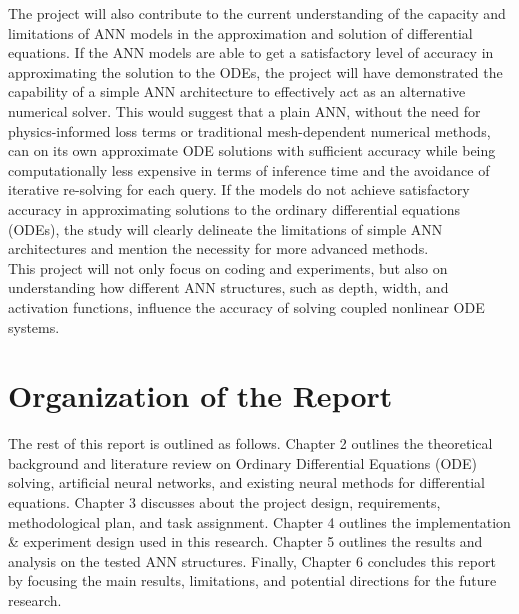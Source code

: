 The project will also contribute to the current understanding of the capacity
and limitations of ANN models in the approximation and solution of differential 
equations. If the ANN models are able to get a satisfactory level of accuracy in 
approximating the solution to the ODEs, the project will have demonstrated 
the capability of a simple ANN architecture to effectively act as an alternative 
numerical solver. This would suggest that a plain ANN, without the need for 
physics-informed loss terms or traditional mesh-dependent numerical 
methods, can on its own approximate ODE solutions with sufficient accuracy 
while being computationally less expensive in terms of inference time and the 
avoidance of iterative re-solving for each query. If the models do not achieve satisfactory accuracy in approximating solutions to the ordinary differential equations (ODEs), the study will clearly delineate the limitations of simple ANN architectures and mention the necessity for more advanced methods. \\[1pt]

This project will not only focus on coding and experiments, but also on understanding how different ANN structures, such as depth, width, and activation functions, influence the accuracy of solving coupled nonlinear ODE systems.



\section{Organization of the Report}
The rest of this report is outlined as follows. Chapter 2 outlines the theoretical 
background and literature review on Ordinary Differential Equations (ODE) 
solving, artificial neural networks, and existing neural methods for differential 
equations. Chapter 3 discusses about the project design, requirements, 
methodological plan, and task assignment. Chapter 4 outlines the 
implementation \& experiment design used in this research. Chapter 5 outlines 
the results and analysis on the tested ANN structures. Finally, Chapter 6 
concludes this report by focusing the main results, limitations, and potential 
directions for the future research. 
